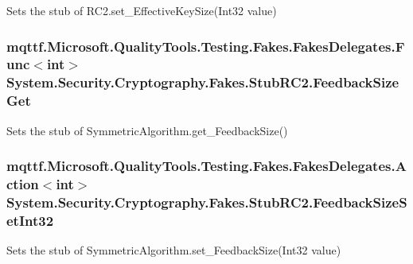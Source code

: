 Sets the stub of R\-C2.\-set\-\_\-\-Effective\-Key\-Size(\-Int32 value)

\hypertarget{class_system_1_1_security_1_1_cryptography_1_1_fakes_1_1_stub_r_c2_aee6ed454ca364341899bbe8a6ce1a627}{
\subsubsection[{Feedback\-Size\-Get}]{\setlength{\rightskip}{0pt plus 5cm}mqttf.\-Microsoft.\-Quality\-Tools.\-Testing.\-Fakes.\-Fakes\-Delegates.\-Func$<$int$>$ System.\-Security.\-Cryptography.\-Fakes.\-Stub\-R\-C2.\-Feedback\-Size\-Get}}\label{class_system_1_1_security_1_1_cryptography_1_1_fakes_1_1_stub_r_c2_aee6ed454ca364341899bbe8a6ce1a627}


Sets the stub of Symmetric\-Algorithm.\-get\-\_\-\-Feedback\-Size()

\hypertarget{class_system_1_1_security_1_1_cryptography_1_1_fakes_1_1_stub_r_c2_a52ed66568cd81935e62afbaa2fcb8eea}{
\subsubsection[{Feedback\-Size\-Set\-Int32}]{\setlength{\rightskip}{0pt plus 5cm}mqttf.\-Microsoft.\-Quality\-Tools.\-Testing.\-Fakes.\-Fakes\-Delegates.\-Action$<$int$>$ System.\-Security.\-Cryptography.\-Fakes.\-Stub\-R\-C2.\-Feedback\-Size\-Set\-Int32}}\label{class_system_1_1_security_1_1_cryptography_1_1_fakes_1_1_stub_r_c2_a52ed66568cd81935e62afbaa2fcb8eea}


Sets the stub of Symmetric\-Algorithm.\-set\-\_\-\-Feedback\-Size(\-Int32 value)

